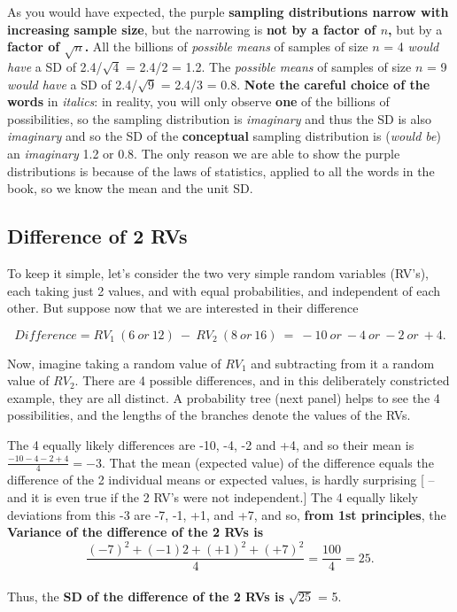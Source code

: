 \documentclass[]{book}
\begin{document}
As you would have expected, the purple \textbf{sampling distributions narrow with increasing sample size}, but the narrowing is \textbf{not by a factor of \(n\),} but by a \textbf{factor of \(\sqrt{n}\).} All the billions of \emph{possible means} of samples of size \(n\) = 4
\emph{would have} a SD of 2.4/\(\sqrt{4}\) = 2.4/2 = 1.2. The \emph{possible means} of samples of size \(n\) = 9 \emph{would have} a SD of 2.4/\(\sqrt{9}\) = 2.4/3 = 0.8.
\textbf{Note the careful choice of the words} in \emph{italics}: in reality, you will only observe \textbf{one} of the billions of possibilities, so the sampling distribution is \emph{imaginary} and thus the SD is also \emph{imaginary} and so the SD of the \textbf{conceptual} sampling distribution is (\emph{would be}) an \emph{imaginary} 1.2 or 0.8. The only reason we are able to show the purple distributions is because of the laws of statistics, applied to all the words in the book, so we know the mean and the unit SD.

\hypertarget{difference-of-2-rvs}{%
\subsection{Difference of 2 RVs}\label{difference-of-2-rvs}}

To keep it simple, let's consider the two very simple random variables (RV's), each taking just 2 values, and with equal probabilities, and independent of each other. But suppose now that we are interested in their difference

\[Difference = RV_1 \ (6 \ or \ 12) \ - \ RV_2 \ (8 \ or \ 16) \ = \ -10 \ or \ -4 \ or \ -2 \ or \ +4.\]

Now, imagine taking a random value of \(RV_1\) and subtracting from it a random value of \(RV_2\). There are 4 possible differences, and in this deliberately constricted example, they are all distinct. A probability tree (next panel) helps to see the 4 possibilities, and the lengths of the branches denote the values of the RVs.

The 4 equally likely differences are -10, -4, -2 and +4, and so their mean is \(\frac{-10 -4 -2 +4}{4} = -3.\) That the mean (expected value) of the difference equals the difference of the 2 individual means or expected values, is hardly surprising {[} -- and it is even true if the 2 RV's were not independent.{]} The 4 equally likely deviations from this -3 are -7, -1, +1, and +7, and so, \textbf{from 1st principles}, the \textbf{Variance of the difference of the 2 RVs is}
\[\frac{(-7)^2 + (-1)2 +  (+1)^2 +  (+7)^2}{4} = \frac{100}{4} = 25.\]\\
Thus, the \textbf{SD of the difference of the 2 RVs is} \(\sqrt{25}\) = 5.
\end{document}
